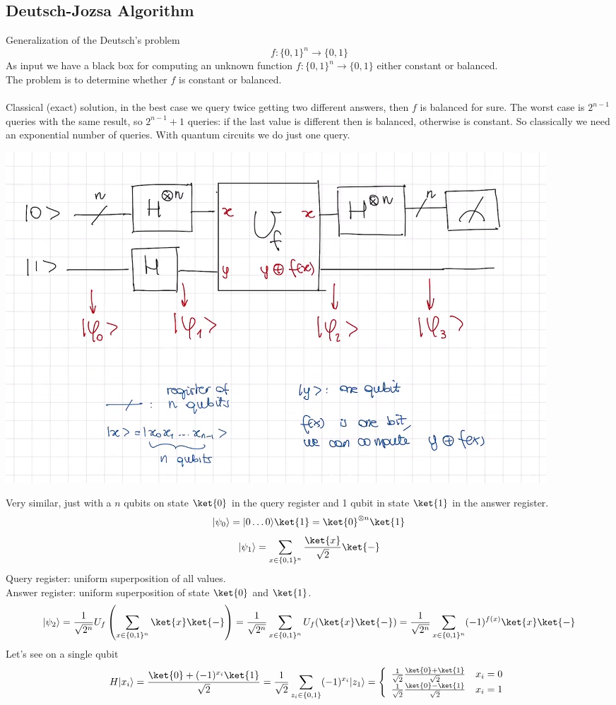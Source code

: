 \documentclass[10pt]{report}
\begin{document}
\subsection{Deutsch-Jozsa Algorithm} Generalization of the Deutsch's problem
$$f:\{0,1\}^n\rightarrow\{0,1\}$$
As input we have a black box for computing an unknown function $f:\{0,1\}^n\rightarrow\{0,1\}$ either constant or balanced.\\
The problem is to determine whether $f$ is constant or balanced.\\\\
Classical (exact) solution, in the best case we query twice getting two different answers, then $f$ is balanced for sure. The worst case is $2^{n-1}$ queries with the same result, so $2^{n-1}+1$ queries: if the last value is different then is balanced, otherwise is constant. So classically we need an exponential number of queries. With quantum circuits we do just one query.
\begin{center}
	\includegraphics[scale=0.5]{23.png}
\end{center}
Very similar, just with a $n$ qubits on state $\ket{0}$ in the query register and 1 qubit in state $\ket{1}$ in the answer register.
$$|\psi_0\rangle = |0\ldots 0\rangle\ket{1} = \ket{0}^{\otimes n}\ket{1}$$
$$|\psi_1\rangle = \sum_{x\in\{0,1\}^n}\frac{\ket{x}}{\sqrt{2}}\ket{-}$$
Query register: uniform superposition of all values.\\
Answer register: uniform superposition of state $\ket{0}$ and $\ket{1}$.
$$|\psi_2\rangle = \frac{1}{\sqrt{2^n}}U_f\left(\sum_{x\in\{0,1\}^n}\ket{x}\ket{-}\right) = \frac{1}{\sqrt{2^n}} \sum_{x\in\{0,1\}^n} U_f(\ket{x}\ket{-}) = \frac{1}{\sqrt{2^n}} \sum_{x\in\{0,1\}^n} (-1)^{f(x)}\ket{x}\ket{-}$$
Let's see on a single qubit
$$H|x_i\rangle = \frac{\ket{0}+(-1)^{x_i}\ket{1}}{\sqrt{2}} = \frac{1}{\sqrt{2}} \sum_{z_i\in\{0,1\}} (-1)^{x_i}|z_1\rangle=\left\{\begin{array}{l l}
\frac{1}{\sqrt{2}}\frac{\ket{0}+\ket{1}}{\sqrt{2}} & x_i = 0\\
\frac{1}{\sqrt{2}}\frac{\ket{0}-\ket{1}}{\sqrt{2}} & x_i = 1\\
\end{array}\right.$$
\end{document}
